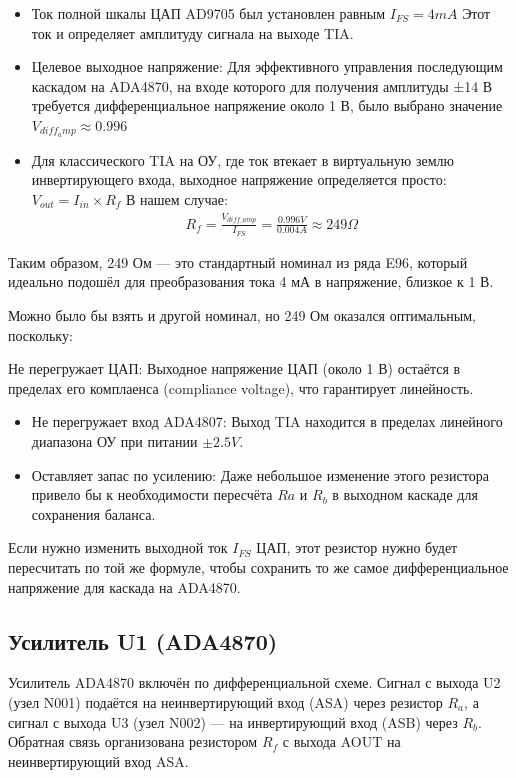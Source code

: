 \documentclass[a4paper, 12pt]{article}
\begin{document}
\begin{itemize}
    \item Ток полной шкалы ЦАП AD9705 был установлен равным \(I_{FS} = 4 mA\) Этот ток и определяет амплитуду сигнала на выходе TIA.
    \item Целевое выходное напряжение: Для эффективного управления последующим каскадом на ADA4870, на входе которого для получения амплитуды ±14 В требуется дифференциальное напряжение около 1 В, было выбрано значение \(V_{diff_amp} \approx 0.996\)
    \item Для классического TIA на ОУ, где ток втекает в виртуальную землю инвертирующего входа, выходное напряжение определяется просто: \(V_{out} = I_{in} \times R_f\) В нашем случае:
\begin{align}
    R_f = \frac{V_{diff\_amp}}{I_{FS}} = \frac{0.996V}{0.004A} \approx 249 \Omega
\end{align}    
\end{itemize}

\par Таким образом, 249 Ом — это стандартный номинал из ряда E96, который идеально подошёл для преобразования тока 4 мА в напряжение, близкое к 1 В.
\par Можно было бы взять и другой номинал, но 249 Ом оказался оптимальным, поскольку:
\par Не перегружает ЦАП: Выходное напряжение ЦАП (около 1 В) остаётся в пределах его комплаенса (compliance voltage), что гарантирует линейность.
\begin{itemize}
    \item Не перегружает вход ADA4807: Выход TIA находится в пределах линейного диапазона ОУ при питании \(\pm 2.5V\).
    \item Оставляет запас по усилению: Даже небольшое изменение этого резистора привело бы к необходимости пересчёта \(Ra\) и \(R_b\)   в выходном каскаде для сохранения баланса.
\end{itemize}

\par Если нужно изменить выходной ток \(I_{FS}\) ЦАП, этот резистор нужно будет пересчитать по той же формуле, чтобы сохранить то же самое дифференциальное напряжение для каскада на ADA4870.

\subsection{Усилитель U1 (ADA4870)}

Усилитель ADA4870 включён по дифференциальной схеме.
Сигнал с выхода U2 (узел N001) подаётся на неинвертирующий вход
(ASA) через резистор \(R_a\), а сигнал с выхода U3 (узел N002) —
на инвертирующий вход (ASB) через \(R_b\). Обратная связь
организована резистором \(R_f\) с выхода AOUT на неинвертирующий
вход ASA.
\end{document}
